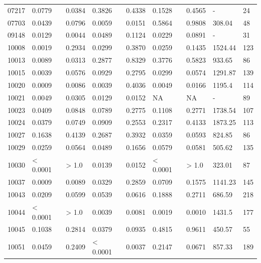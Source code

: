 \begin{table}[H]
{\begin{tabular}{lllllllll}
07217 & 0.0779 & {\color{red}0.0384} & 0.3826 & 0.4338 & 0.1528 & 0.4565 & - & 24 \\ 
07703 & {\color{red}0.0439} & 0.0796 & {\color{red}0.0059} & {\color{red}0.0151} & 0.5864 & 0.9808 & 308.04 & 48 \\ 
09148 & {\color{red}0.0129} & {\color{red}0.0044} & {\color{red}0.0489} & 0.1124 & {\color{red}0.0229} & 0.0891 & - & 31 \\ 
10008 & {\color{red}0.0019} & 0.2934 & {\color{red}0.0299} & 0.3870 & {\color{red}0.0259} & 0.1435 & 1524.44 & 123 \\ 
10013 & {\color{red}0.0089} & {\color{red}0.0313} & 0.2877 & 0.8329 & 0.3776 & 0.5823 & 933.65 & 86 \\ 
10015 & {\color{red}0.0039} & 0.0576 & 0.0929 & 0.2795 & {\color{red}0.0299} & 0.0574 & 1291.87 & 139 \\ 
10020 & {\color{red}0.0009} & {\color{red}0.0086} & {\color{red}0.0039} & 0.4036 & {\color{red}0.0049} & {\color{red}0.0166} & 1195.4 & 114 \\ 
10021 & {\color{red}0.0049} & {\color{red}0.0305} & {\color{red}0.0129} & {\color{red}0.0152} & NA & NA & - & 89 \\ 
10023 & {\color{red}0.0409} & 0.0848 & 0.0789 & 0.2775 & 0.1108 & 0.2771 & 1738.54 & 107 \\ 
10024 & {\color{red}0.0379} & 0.0749 & 0.0909 & 0.2553 & 0.2317 & 0.4133 & 1873.25 & 113 \\ 
10027 & 0.1638 & 0.4139 & 0.2687 & 0.3932 & {\color{red}0.0359} & 0.0593 & 824.85 & 86 \\ 
10029 & {\color{red}0.0259} & 0.0564 & {\color{red}0.0489} & 0.1656 & 0.0579 & 0.0581 & 505.62 & 135 \\ 
10030 & {\color{red} < 0.0001} & > 1.0 & {\color{red}0.0139} & {\color{red}0.0152} & {\color{red} < 0.0001} & > 1.0 & 323.01 & 87 \\ 
10037 & {\color{red}0.0009} & {\color{red}0.0089} & {\color{red}0.0329} & 0.2859 & 0.0709 & 0.1575 & 1141.23 & 145 \\ 
10043 & {\color{red}0.0209} & 0.0599 & 0.0539 & 0.0616 & 0.1888 & 0.2711 & 686.59 & 218 \\ 
10044 & {\color{red} < 0.0001} & > 1.0 & {\color{red}0.0039} & {\color{red}0.0081} & {\color{red}0.0019} & {\color{red}0.0010} & 1431.5 & 177 \\ 
10045 & 0.1038 & 0.2814 & {\color{red}0.0379} & 0.0935 & 0.4815 & 0.9611 & 450.57 & 55 \\ 
10051 & {\color{red}0.0459} & 0.2409 & {\color{red} < 0.0001} & {\color{red}0.0037} & 0.2147 & 0.0671 & 857.33 & 189 \\ 

\end{tabular}}
\end{table}
